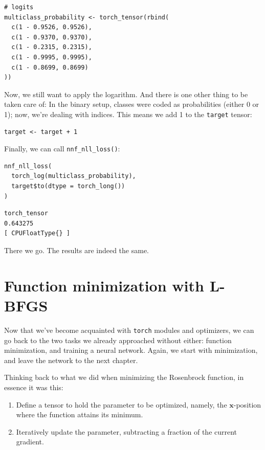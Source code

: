 \documentclass[
  letterpaper,
]{krantz}
\begin{document}
\begin{verbatim}
# logits
multiclass_probability <- torch_tensor(rbind(
  c(1 - 0.9526, 0.9526),
  c(1 - 0.9370, 0.9370),
  c(1 - 0.2315, 0.2315),
  c(1 - 0.9995, 0.9995),
  c(1 - 0.8699, 0.8699)
))
\end{verbatim}

Now, we still want to apply the logarithm. And there is one other thing
to be taken care of: In the binary setup, classes were coded as
probabilities (either 0 or 1); now, we're dealing with indices. This
means we add 1 to the \texttt{target} tensor:

\begin{verbatim}
target <- target + 1
\end{verbatim}

Finally, we can call \texttt{nnf\_nll\_loss()}:

\begin{verbatim}
nnf_nll_loss(
  torch_log(multiclass_probability),
  target$to(dtype = torch_long())
)
\end{verbatim}

\begin{verbatim}
torch_tensor
0.643275
[ CPUFloatType{} ]
\end{verbatim}

There we go. The results are indeed the same.

\hypertarget{sec:optim-2}{%
\chapter{Function minimization with L-BFGS}\label{sec:optim-2}}

Now that we've become acquainted with \texttt{torch} modules and
optimizers, we can go back to the two tasks we already approached
without either: function minimization, and training a neural network.
Again, we start with minimization, and leave the network to the next
chapter.

Thinking back to what we did when minimizing the Rosenbrock function, in
essence it was this:

\begin{enumerate}
\def\labelenumi{\arabic{enumi}.}
\item
  Define a tensor to hold the parameter to be optimized, namely, the
  \(\mathbf{x}\)-position where the function attains its minimum.
\item
  Iteratively update the parameter, subtracting a fraction of the
  current gradient.
\end{enumerate}
\end{document}
